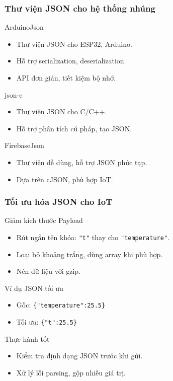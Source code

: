 \begin{frame}
\frametitle{Thư viện JSON cho hệ thống nhúng}
\begin{block}{ArduinoJson}
\begin{itemize}
\item Thư viện JSON cho ESP32, Arduino.
\item Hỗ trợ serialization, deserialization.
\item API đơn giản, tiết kiệm bộ nhớ.
\end{itemize}
\end{block}

\begin{block}{json-c}
\begin{itemize}
\item Thư viện JSON cho C/C++.
\item Hỗ trợ phân tích cú pháp, tạo JSON.
\end{itemize}
\end{block}

\begin{block}{FirebaseJson}
\begin{itemize}
\item Thư viện dễ dùng, hỗ trợ JSON phức tạp.
\item Dựa trên cJSON, phù hợp IoT.
\end{itemize}
\end{block}
\end{frame}

\begin{frame}
\frametitle{Tối ưu hóa JSON cho IoT}
\begin{block}{Giảm kích thước Payload}
\begin{itemize}
\item Rút ngắn tên khóa: \texttt{"t"} thay cho \texttt{"temperature"}.
\item Loại bỏ khoảng trắng, dùng array khi phù hợp.
\item Nén dữ liệu với gzip.
\end{itemize}
\end{block}

\begin{exampleblock}{Ví dụ JSON tối ưu}
\begin{itemize}
\item Gốc: \texttt{\{"temperature":25.5\}}
\item Tối ưu: \texttt{\{"t":25.5\}}
\end{itemize}
\end{exampleblock}

\begin{block}{Thực hành tốt}
\begin{itemize}
\item Kiểm tra định dạng JSON trước khi gửi.
\item Xử lý lỗi parsing, gộp nhiều giá trị.
\end{itemize}
\end{block}
\end{frame}

